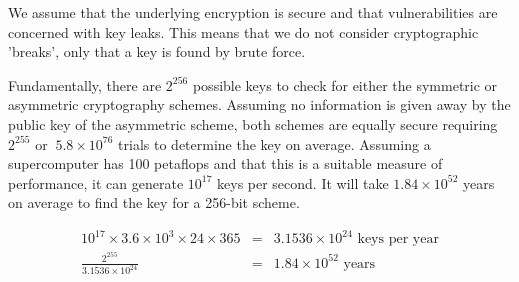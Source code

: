 We assume that the underlying encryption is secure and that vulnerabilities are concerned with key leaks. This means that we do not consider cryptographic 'breaks', only that a key is found by brute force.

Fundamentally, there are $2^{256}$ possible keys to check for either the symmetric or asymmetric cryptography schemes. Assuming no information is given away by the public key of the asymmetric scheme, both schemes are equally secure requiring $2^{255}$ or $~5.8 \times 10^{76}$ trials to determine the key on average. Assuming a supercomputer has 100 petaflops and that this is a suitable measure of performance, it can generate $10^{17}$ keys per second. It will take $1.84 \times 10^{52}$ years on average to find the key for a 256-bit scheme.

$$
\begin{aligned}
  10^{17} \times 3.6 \times 10^{3} \times 24 \times 365 &=& 3.1536 \times 10^{24} \text{ keys per year} \\
  \frac{2^{255}}{3.1536 \times 10^{24}} &=& 1.84 \times 10^{52} \text{ years}
\end{aligned}
$$
